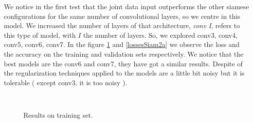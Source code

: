 

We notice in the first test that the joint data input outperforms the other siamese configurations for the same number of convolutional layers, so we centre in this model. We increased the number of layers of that architecture, \textit{conv I}, refers to this type of model, with $I$ the number of layers. So, we explored conv3, conv4, conv5, conv6, conv7. In the figure \ref{lossesSiam1a} and \ref{lossesSiam2a} we observe the loss and the accuracy on the training and validation sets respectively. We notice that the best models are the conv6 and conv7, they have got a similar results. Despite of the regularization techniques applied to the models are a little bit noisy but it is tolerable ( except conv3, it is too noisy ).

\begin{figure}[H]
		
\centering

\\

\caption{Results on training set.}
\label{lossesSiam1a}
\end{figure}


